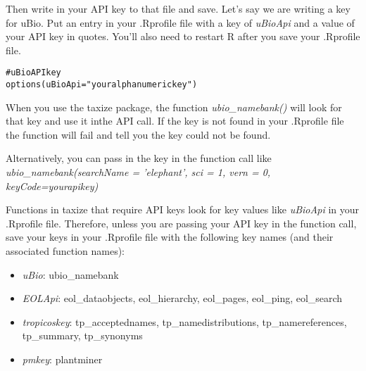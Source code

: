 \documentclass[letterpaper,superscriptaddress,showkeys,longbibliography]{revtex4-1}\usepackage[]{graphicx}\usepackage[]{color}
\makeatletter
\newenvironment{kframe}{%
 \def\at@end@of@kframe{}%
 \ifinner\ifhmode%
  \def\at@end@of@kframe{\end{minipage}}%
  \begin{minipage}{\columnwidth}%
 \fi\fi%
 \def\FrameCommand##1{\hskip\@totalleftmargin \hskip-\fboxsep
 \colorbox{shadecolor}{##1}\hskip-\fboxsep
     \hskip-\linewidth \hskip-\@totalleftmargin \hskip\columnwidth}%
 \MakeFramed {\advance\hsize-\width
   \@totalleftmargin\z@ \linewidth\hsize
   \@setminipage}}%
 {\par\unskip\endMakeFramed%
 \at@end@of@kframe}
\newenvironment{knitrout}{}{} %
\makeatother
\begin{document}
Then write in your API key to that file and save. Let's say we are writing a key for uBio. Put an entry in your .Rprofile file with a key of \emph{uBioApi} and a value of your API key in quotes. You'll also need to restart R after you save your .Rprofile file. 

\begin{knitrout}
\color{fgcolor}\begin{kframe}
\begin{alltt}
# uBio API key
options(uBioApi = "youralphanumerickey")
\end{alltt}
\end{kframe}
\end{knitrout}


When you use the taxize package, the function \emph{ubio\_namebank()} will look for that key and use it inthe API call. If the key is not found in your .Rprofile file the function will fail and tell you the key could not be found. 

Alternatively, you can pass in the key in the function call like \emph{ubio\_namebank(searchName = 'elephant', sci = 1, vern = 0, keyCode=yourapikey)}

Functions in taxize that require API keys look for key values like \emph{uBioApi} in your .Rprofile file. Therefore, unless you are passing your API key in the function call, save your keys in your .Rprofile file with the following key names (and their associated function names):

\begin{itemize}
  \item \emph{uBio}: ubio\_namebank
  \item \emph{EOLApi}: eol\_dataobjects, eol\_hierarchy, eol\_pages, eol\_ping, eol\_search
  \item \emph{tropicoskey}: tp\_acceptednames, tp\_namedistributions, tp\_namereferences, tp\_summary, tp\_synonyms
  \item \emph{pmkey}: plantminer
\end{itemize}
\end{document}
